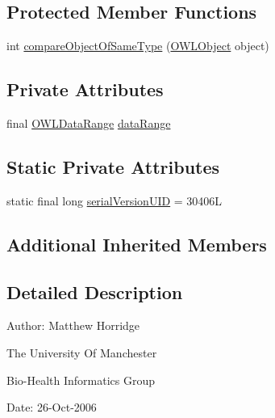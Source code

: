 \subsection*{Protected Member Functions}
\begin{DoxyCompactItemize}
\item 
int \hyperlink{classuk_1_1ac_1_1manchester_1_1cs_1_1owl_1_1owlapi_1_1_o_w_l_data_complement_of_impl_af357d5e9713261ede7a2ecbb8940bc34}{compare\-Object\-Of\-Same\-Type} (\hyperlink{interfaceorg_1_1semanticweb_1_1owlapi_1_1model_1_1_o_w_l_object}{O\-W\-L\-Object} object)
\end{DoxyCompactItemize}
\subsection*{Private Attributes}
\begin{DoxyCompactItemize}
\item 
final \hyperlink{interfaceorg_1_1semanticweb_1_1owlapi_1_1model_1_1_o_w_l_data_range}{O\-W\-L\-Data\-Range} \hyperlink{classuk_1_1ac_1_1manchester_1_1cs_1_1owl_1_1owlapi_1_1_o_w_l_data_complement_of_impl_abf47ed02b4b05d4398a6db311346bd21}{data\-Range}
\end{DoxyCompactItemize}
\subsection*{Static Private Attributes}
\begin{DoxyCompactItemize}
\item 
static final long \hyperlink{classuk_1_1ac_1_1manchester_1_1cs_1_1owl_1_1owlapi_1_1_o_w_l_data_complement_of_impl_ade73de083c3e9457b115d5b88d479f86}{serial\-Version\-U\-I\-D} = 30406\-L
\end{DoxyCompactItemize}
\subsection*{Additional Inherited Members}


\subsection{Detailed Description}
Author\-: Matthew Horridge\par
 The University Of Manchester\par
 Bio-\/\-Health Informatics Group\par
 Date\-: 26-\/\-Oct-\/2006\par
\par
 


